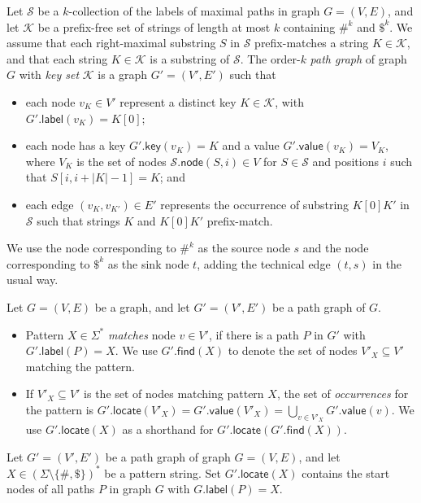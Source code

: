 \documentclass[a4paper,UKenglish]{lipics-v2016}
\newcommand{\set}[1]{\ensuremath{\{ #1 \}}}
\newcommand{\abs}[1]{\ensuremath{\lvert #1 \rvert}}
\newcommand{\find}{\ensuremath{\mathsf{find}}}
\newcommand{\locate}{\ensuremath{\mathsf{locate}}}
\newcommand{\glabel}{\ensuremath{\mathsf{label}}}
\newcommand{\gkey}{\ensuremath{\mathsf{key}}}
\newcommand{\gvalue}{\ensuremath{\mathsf{value}}}
\newcommand{\gnode}{\ensuremath{\mathsf{node}}}
\newcommand{\kcollection}[1]{$#1$\nobreakdash-collection}
\newcommand{\orderk}[1]{order\nobreakdash-$#1$}
\begin{document}
\begin{definition}
Let $\mathcal{S}$ be a \kcollection{k} of the labels of maximal paths in graph $G = (V, E)$, and let $\mathcal{K}$ be a prefix-free set of strings of length at most $k$ containing $\#^{k}$ and $\$^{k}$. We assume that each right-maximal substring $S$ in $\mathcal{S}$ prefix-matches a string $K \in \mathcal{K}$, and that each string $K \in \mathcal{K}$ is a substring of $\mathcal{S}$. The \orderk{k} \emph{path graph} of graph $G$ with \emph{key set} $\mathcal{K}$ is a graph $G' = (V', E')$ such that
\begin{itemize}
\item each node $v_{K} \in V'$ represent a distinct key $K \in \mathcal{K}$, with $G'.\glabel(v_{K}) = K[0]$;
\item each node has a key $G'.\gkey(v_{K}) = K$ and a value $G'.\gvalue(v_{K}) = V_{K}$, where $V_{K}$ is the set of nodes $\mathcal{S}.\gnode(S, i) \in V$ for $S \in \mathcal{S}$ and positions $i$ such that $S[i, i+\abs{K}-1] = K$; and
\item each edge $(v_{K}, v_{K'}) \in E'$ represents the occurrence of substring $K[0] K'$ in $\mathcal{S}$ such that strings $K$ and $K[0] K'$ prefix-match.
\end{itemize}
We use the node corresponding to $\#^{k}$ as the source node $s$ and the node corresponding to $\$^{k}$ as the sink node $t$, adding the technical edge $(t, s)$ in the usual way.
\end{definition}

\begin{definition}
Let $G = (V, E)$ be a graph, and let $G' = (V', E')$ be a path graph of $G$.
\begin{itemize}
\item Pattern $X \in \Sigma^{\ast}$ \emph{matches} node $v \in V'$, if there is a path $P$ in $G'$ with $G'.\glabel(P) = X$. We use $G'.\find(X)$ to denote the set of nodes $V'_{X} \subseteq V'$ matching the pattern.
\item If $V'_{X} \subseteq V'$ is the set of nodes matching pattern $X$, the set of \emph{occurrences} for the pattern is $G'.\locate(V'_{X}) = G'.\gvalue(V'_{X}) = \bigcup_{v \in V'_{X}} G'.\gvalue(v)$. We use $G'.\locate(X)$ as a shorthand for $G'.\locate(G'.\find(X))$.
\end{itemize}
\end{definition}

\begin{lemma}\label{lemma:pg-fn}
Let $G' = (V', E')$ be a path graph of graph $G = (V, E)$, and let $X \in (\Sigma \setminus \set{\#, \$})^{\ast}$ be a pattern string. Set $G'.\locate(X)$ contains the start nodes of all paths $P$ in graph $G$ with $G.\glabel(P) = X$.
\end{lemma}
\end{document}
